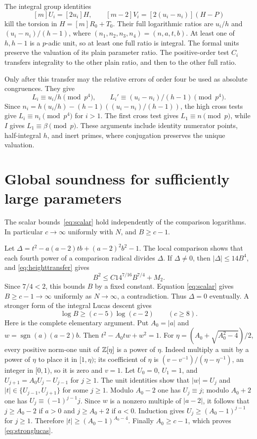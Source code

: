 \documentclass[11pt,a4paper]{article}
\begin{document}
The integral group identities
\[
                  [m]U_i=[2u_i]H,\qquad
                  [m-2]V_i=[2(u_i-n_i)](H-P)
\]
kill the torsion in $H=[m]R_0+T_0$. Their full logarithmic ratios
are $u_i/h$ and $(u_i-n_i)/(h-1)$, where
$(n_1,n_2,n_3,n_4)=(n,a,t,b)$. At least one of $h,h-1$ is a
$p$-adic unit, so at least one full ratio is integral. The formal
units preserve the valuation of its plain parameter ratio.
The positive-order test $C_i$ transfers integrality to the other
plain ratio, and then to the other full ratio.

Only after this transfer may the relative errors of order four
be used as absolute congruences. They give
\[
 L_i\equiv u_i/h\pmod{p^4},\qquad
 L_i'\equiv(u_i-n_i)/(h-1)\pmod{p^4}.
\]
Since $n_i=h(u_i/h)-(h-1)((u_i-n_i)/(h-1))$, the high cross tests
give $L_i\equiv n_i\pmod{p^4}$ for $i>1$. The first cross test
gives $L_1\equiv n\pmod p$, while $I$ gives $L_1\equiv\beta\pmod p$.
These arguments include identity numerator points, half-integral $h$,
and inert primes, where conjugation preserves the unique valuation.

\section{Global soundness for sufficiently large parameters}\label{sec:soundness}
The scalar bounds~\eqref{eq:scalar} hold independently of the
comparison logarithms. In particular $c\to\infty$ uniformly with $N$,
and $B\ge c-1$.

Let
$\Delta=t^2-a(a-2)tb+(a-2)^2b^2-1$.
The local comparison shows that each fourth power of a comparison
radical divides $\Delta$. If $\Delta\ne0$, then
$|\Delta|\le14B^4$, and \eqref{eq:heighttransfer} gives
\[
                  B^2\le C14^{7/16}B^{7/4}+M_2.
\]
Since $7/4<2$, this bounds $B$ by a fixed constant. Equation
\eqref{eq:scalar} gives $B\ge c-1\to\infty$ uniformly as
$N\to\infty$, a contradiction. Thus $\Delta=0$ eventually.
A stronger form of the integral Lucas descent gives
\begin{equation}\label{eq:stronglucas}
              \log B\ge(c-5)\log(c-2)\qquad(c\ge8).
\end{equation}
Here is the complete elementary argument. Put $A_0=|a|$ and
$w=\operatorname{sgn}(a)(a-2)b$. Then
$t^2-A_0tw+w^2=1$. For
$\eta=(A_0+\sqrt{A_0^2-4})/2$, every positive norm-one unit of
$\mathbb Z[\eta]$ is a power of $\eta$. Indeed multiply a unit by a
power of $\eta$ to place it in $[1,\eta)$; its coefficient of
$\eta$ is $(v-v^{-1})/(\eta-\eta^{-1})$, an integer in $[0,1)$,
so it is zero and $v=1$.
Let $U_0=0$, $U_1=1$, and $U_{j+1}=A_0U_j-U_{j-1}$ for $j\ge1$.
The unit identities show that $|w|=U_j$ and
$|t|\in\{U_{j-1},U_{j+1}\}$ for some $j\ge1$.
Modulo $A_0-2$ one has $U_j\equiv j$; modulo $A_0+2$ one has
$U_j\equiv(-1)^{j-1}j$. Since $w$ is a nonzero multiple of
$|a-2|$, it follows that $j\ge A_0-2$ if $a>0$ and
$j\ge A_0+2$ if $a<0$. Induction gives
$U_j\ge(A_0-1)^{j-1}$ for $j\ge1$. Therefore
$|t|\ge(A_0-1)^{A_0-4}$. Finally $A_0\ge c-1$, which proves
\eqref{eq:stronglucas}.
\end{document}
